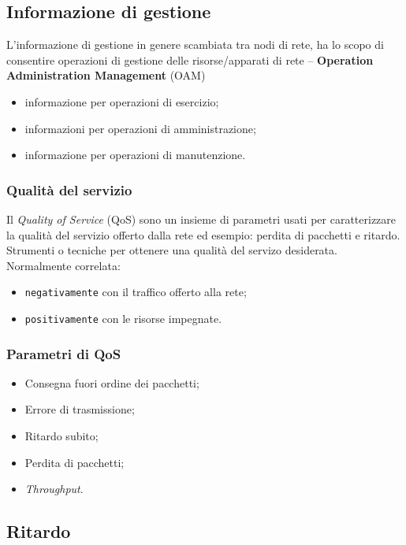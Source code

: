 \subsection{Informazione di gestione}
\label{sec:infodigest}

L'informazione di gestione in genere scambiata tra nodi di rete, ha lo scopo di consentire operazioni di
gestione delle risorse/apparati di rete -- \textbf{Operation Administration Management} (OAM)
\begin{itemize}
\item informazione per operazioni di esercizio;
\item informazioni per operazioni di amministrazione;
\item informazione per operazioni di manutenzione.
\end{itemize}

\subsubsection{Qualità del servizio}
\label{sec:qualserv}
Il \textit{Quality of Service} (QoS) sono un insieme di parametri usati per caratterizzare la qualità
del servizio offerto dalla rete ed esempio: perdita di pacchetti e ritardo. Strumenti o tecniche per ottenere una
qualità del servizo desiderata. Normalmente correlata:
\begin{itemize}
\item \texttt{negativamente} con il traffico offerto alla rete;
\item \texttt{positivamente} con le risorse impegnate. 
\end{itemize}

\subsubsection{Parametri di QoS}
\label{sec:prQoS}

\begin{itemize}
\item Consegna fuori ordine dei pacchetti;
\item Errore di trasmissione;
\item Ritardo subito;
\item Perdita di pacchetti;
\item \textit{Throughput}.
\end{itemize}

\subsection{Ritardo}
\label{sec:ridardo}

